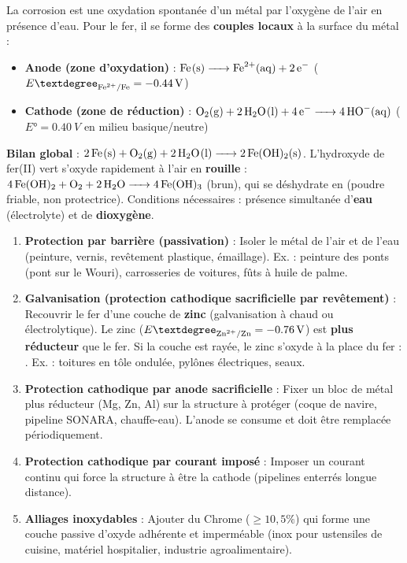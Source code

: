 \documentclass[11pt]{article}
\newcommand{\cle}[1]{{\popxbold\color{popdark}#1}}
\newcounter{popsec}
\newcounter{popsub}
\newcommand{\courssub}[1]{%
  \stepcounter{popsub}%
  \par\vspace{9pt}\noindent{\popxbold\fontsize{11.5}{13}\selectfont\color{popink}{\color{poporange}\thepopsec.\thepopsub}\hspace{6pt}#1}\par\nopagebreak\vspace{4pt}
}
\begin{document}
\courssub{Corrosion et protection des métaux}

\begin{aretenir}
La corrosion est une \cle{oxydation spontanée} d'un métal par l'oxygène de l'air en présence d'eau. Pour le fer, il se forme des \textbf{couples locaux} à la surface du métal :
\begin{itemize}
\item \textbf{Anode (zone d'oxydation)} : $\ce{Fe(s) -> Fe^2+(aq) + 2e-}$ \quad ($E°_{\ce{Fe^2+}/\ce{Fe}} = \SI{-0,44}{V}$)
\item \textbf{Cathode (zone de réduction)} : $\ce{O2(g) + 2H2O(l) + 4e- -> 4HO-(aq)}$ \quad ($E° = \SI{+0,40}{V}$ en milieu basique/neutre)
\end{itemize}
\textbf{Bilan global} : $\ce{2Fe(s) + O2(g) + 2H2O(l) -> 2Fe(OH)2(s)}$.
L'hydroxyde de fer(II) vert  s'oxyde rapidement à l'air en \textbf{rouille} : $\ce{4Fe(OH)2 + O2 + 2H2O -> 4Fe(OH)3}$ (brun), qui se déshydrate en  (poudre friable, non protectrice).
\cle{Conditions nécessaires} : présence simultanée d'\textbf{eau} (électrolyte) et de \textbf{dioxygène}.
\end{aretenir}

\begin{methode}
\begin{enumerate}
\item \textbf{Protection par barrière (passivation)} : Isoler le métal de l'air et de l'eau (peinture, vernis, revêtement plastique, émaillage). Ex. : peinture des ponts (pont sur le Wouri), carrosseries de voitures, fûts à huile de palme.
\item \textbf{Galvanisation (protection cathodique sacrificielle par revêtement)} : Recouvrir le fer d'une couche de \textbf{zinc} (galvanisation à chaud ou électrolytique). Le zinc ($E°_{\ce{Zn^2+}/\ce{Zn}} = \SI{-0,76}{V}$) est \textbf{plus réducteur} que le fer. Si la couche est rayée, le zinc s'oxyde à la place du fer : . Ex. : toitures en tôle ondulée, pylônes électriques, seaux.
\item \textbf{Protection cathodique par anode sacrificielle} : Fixer un bloc de métal plus réducteur (Mg, Zn, Al) sur la structure à protéger (coque de navire, pipeline SONARA, chauffe-eau). L'anode se consume et doit être remplacée périodiquement.
\item \textbf{Protection cathodique par courant imposé} : Imposer un courant continu qui force la structure à être la cathode (pipelines enterrés longue distance).
\item \textbf{Alliages inoxydables} : Ajouter du Chrome ($\ge 10,5\%$) qui forme une couche passive d'oxyde  adhérente et imperméable (inox pour ustensiles de cuisine, matériel hospitalier, industrie agroalimentaire).
\end{enumerate}
\end{methode}
\end{document}
